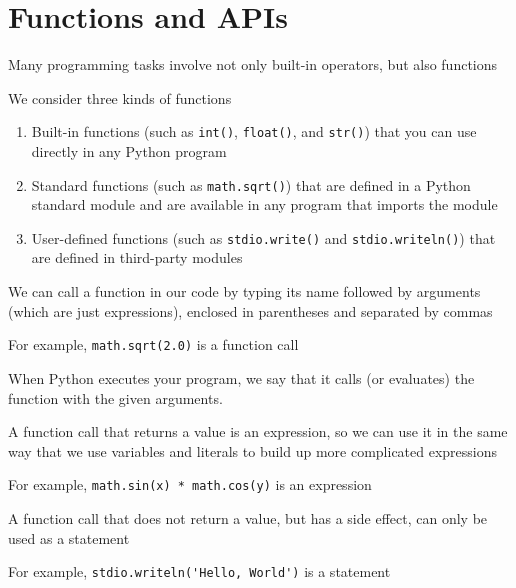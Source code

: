 \documentclass[8pt,a4paper,compress]{beamer}
\begin{document}
\section{Functions and APIs}
\begin{frame}[fragile]
\pause

Many programming tasks involve not only built-in operators, but also functions

\pause\bigskip

We consider three kinds of functions
\begin{enumerate}
\pause
\item Built-in functions (such as \lstinline{int()}, \lstinline{float()}, and \lstinline{str()}) that you can use directly in any Python program

\pause
\item Standard functions (such as \lstinline{math.sqrt()}) that are defined in a Python standard module and are available in any program that imports the module

\pause
\item User-defined functions (such as \lstinline{stdio.write()} and \lstinline{stdio.writeln()}) that are defined in third-party modules
\end{enumerate}

\pause\bigskip

We can call a function in our code by typing its name followed by arguments (which are just expressions), enclosed in parentheses and separated by commas

\pause\bigskip

For example, \lstinline{math.sqrt(2.0)} is a function call

\pause\bigskip

When Python executes your program, we say that it calls (or evaluates) the function with the given arguments.

\pause\bigskip

A function call that returns a value is an expression, so we can use it in the same way that we use variables and literals to build up more complicated expressions

\pause\bigskip

For example, \lstinline{math.sin(x) * math.cos(y)} is an expression

\pause\bigskip

A function call that does not return a value, but has a side effect, can only be used as a statement

\pause\bigskip

For example, \lstinline{stdio.writeln('Hello, World')} is a statement
\end{frame}
\end{document}
